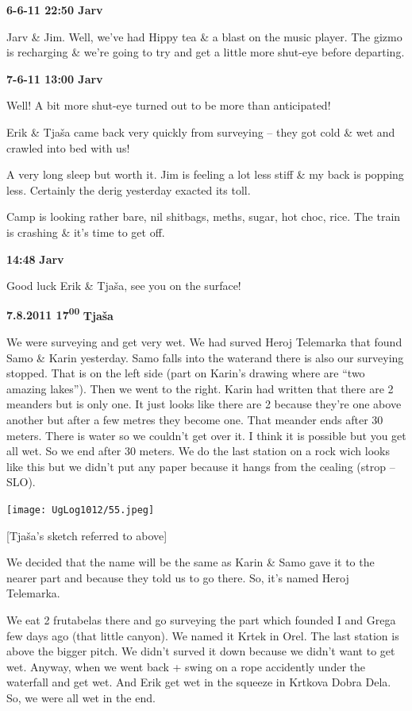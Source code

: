 \textbf{6-6-11 22:50 Jarv}

Jarv \& Jim. Well, we've had Hippy tea \& a blast on the music player.
The gizmo is recharging \& we're going to try and get a little more
shut-eye before departing.

\textbf{7-6-11 13:00 Jarv}

Well! A bit more shut-eye turned out to be more than anticipated!

Erik \& Tjaša came back very quickly from surveying -- they got cold \&
wet and crawled into bed with us!

A very long sleep but worth it. Jim is feeling a lot less stiff \& my
back is popping less. Certainly the derig yesterday exacted its toll.

Camp is looking rather bare, nil shitbags, meths, sugar, hot choc, rice.
The train is crashing \& it's time to get off.

\textbf{14:48} \textbf{Jarv}

Good luck Erik \& Tjaša, see you on the surface!

\textbf{7.8.2011 17\textsuperscript{00}} \textbf{Tjaša}

We were surveying and get very wet. We had surved Heroj Telemarka that
found Samo \& Karin yesterday. Samo falls into the waterand there is
also our surveying stopped. That is on the left side (part on Karin's
drawing where are ``two amazing lakes''). Then we went to the right.
Karin had written that there are 2 meanders but is only one. It just
looks like there are 2 because they're one above another but after a few
metres they become one. That meander ends after 30 meters. There is
water so we couldn't get over it. I think it is possible but you get all
wet. So we end after 30 meters. We do the last station on a rock wich
looks like this but we didn't put any paper because it hangs from the
cealing (strop -- SLO).

\texttt{[image: UgLog1012/55.jpeg]}

{[}Tjaša's sketch referred to above{]}

We decided that the name will be the same as Karin \& Samo gave it to
the nearer part and because they told us to go there. So, it's named
Heroj Telemarka.

We eat 2 frutabelas there and go surveying the part which founded I and
Grega few days ago (that little canyon). We named it Krtek in Orel. The
last station is above the bigger pitch. We didn't surved it down because
we didn't want to get wet. Anyway, when we went back + swing on a rope
accidently under the waterfall and get wet. And Erik get wet in the
squeeze in Krtkova Dobra Dela. So, we were all wet in the end.

